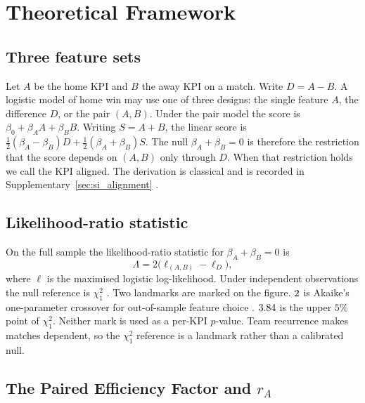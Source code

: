\section{Theoretical Framework}
\label{sec:theory}

\subsection{Three feature sets}

Let $A$ be the home KPI and $B$ the away KPI on a match.
Write $D=A-B$.
A logistic model of home win may use one of three designs: the single feature $A$, the difference $D$, or the pair $(A,B)$.
Under the pair model the score is $\beta_0+\beta_A A+\beta_B B$.
Writing $S=A+B$, the linear score is $\tfrac12(\beta_A-\beta_B)D+\tfrac12(\beta_A+\beta_B)S$.
The null $\beta_A+\beta_B=0$ is therefore the restriction that the score depends on $(A,B)$ only through $D$.
When that restriction holds we call the KPI aligned.
The derivation is classical and is recorded in Supplementary~\cref{sec:si_alignment} \parencite{white1982}.

\subsection{Likelihood-ratio statistic}

On the full sample the likelihood-ratio statistic for $\beta_A+\beta_B=0$ is
\begin{equation}
  \Lambda = 2\bigl(\ell_{(A,B)}-\ell_D\bigr),
  \label{eq:lr}
\end{equation}
where $\ell$ is the maximised logistic log-likelihood.
Under independent observations the null reference is $\chi^2_1$ \parencite{wilks1938}.
Two landmarks are marked on the figure.
$2$ is Akaike's one-parameter crossover for out-of-sample feature choice \parencite{akaike1973,stone1977}.
$3.84$ is the upper $5\%$ point of $\chi^2_1$.
Neither mark is used as a per-KPI $p$-value.
Team recurrence makes matches dependent, so the $\chi^2_1$ reference is a landmark rather than a calibrated null.

\subsection{The Paired Efficiency Factor and \texorpdfstring{$r_A$}{rA}}

